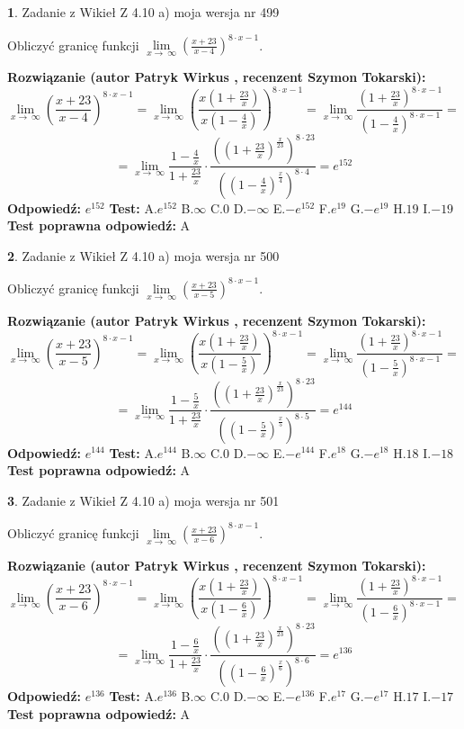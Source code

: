 \documentclass[12pt, a4paper]{article}
\theoremstyle{definition} %
\newtheorem{zad}{}
\newcommand{\zadStart}[1]{\begin{zad}#1\newline}
\newcommand{\zadStop}{\end{zad}}
\newcommand{\rozwStart}[2]{\noindent \textbf{Rozwiązanie (autor #1 , recenzent #2): }\newline}
\newcommand{\rozwStop}{\newline}
\newcommand{\odpStart}{\noindent \textbf{Odpowiedź:}\newline}
\newcommand{\odpStop}{\newline}
\newcommand{\testStart}{\noindent \textbf{Test:}\newline}
\newcommand{\testStop}{\newline}
\newcommand{\kluczStart}{\noindent \textbf{Test poprawna odpowiedź:}\newline}
\newcommand{\kluczStop}{\newline}
\begin{document}
\zadStart{Zadanie z Wikieł Z 4.10 a) moja wersja nr 499}

Obliczyć granicę funkcji  $\lim\limits_{x\to\ \infty}(\frac{x+23}{x-4})^{8\cdot x-1}$.
\zadStop
\rozwStart{Patryk Wirkus}{Szymon Tokarski}
$$\lim\limits_{x\to\ \infty}(\frac{x+23}{x-4})^{8\cdot x-1} = \lim\limits_{x\to\ \infty}(\frac{x(1+\frac{23}{x})}{x(1-\frac{4}{x})})^{8\cdot x-1}=\lim\limits_{x\to\ \infty}\frac{(1+\frac{23}{x})^{8\cdot x-1}}{(1-\frac{4}{x})^{8\cdot x-1}}=$$
$$=\lim\limits_{x\to\ \infty}\frac{1-\frac{4}{x}}{1+\frac{23}{x}}\cdot\frac{((1+\frac{23}{x})^{\frac{x}{23}})^{8\cdot23}}{((1-\frac{4}{x})^{\frac{x}{4}})^{8\cdot4}}=e^{152}$$
\rozwStop
\odpStart
$e^{152}$
\odpStop
\testStart
A.$e^{152}$ B.$\infty$ C.$0$ D.$-\infty$ E.$-e^{152}$
F.$e^{19}$ G.$-e^{19}$
H.$19$
I.$-19$
\testStop
\kluczStart
A
\kluczStop



\zadStart{Zadanie z Wikieł Z 4.10 a) moja wersja nr 500}

Obliczyć granicę funkcji  $\lim\limits_{x\to\ \infty}(\frac{x+23}{x-5})^{8\cdot x-1}$.
\zadStop
\rozwStart{Patryk Wirkus}{Szymon Tokarski}
$$\lim\limits_{x\to\ \infty}(\frac{x+23}{x-5})^{8\cdot x-1} = \lim\limits_{x\to\ \infty}(\frac{x(1+\frac{23}{x})}{x(1-\frac{5}{x})})^{8\cdot x-1}=\lim\limits_{x\to\ \infty}\frac{(1+\frac{23}{x})^{8\cdot x-1}}{(1-\frac{5}{x})^{8\cdot x-1}}=$$
$$=\lim\limits_{x\to\ \infty}\frac{1-\frac{5}{x}}{1+\frac{23}{x}}\cdot\frac{((1+\frac{23}{x})^{\frac{x}{23}})^{8\cdot23}}{((1-\frac{5}{x})^{\frac{x}{5}})^{8\cdot5}}=e^{144}$$
\rozwStop
\odpStart
$e^{144}$
\odpStop
\testStart
A.$e^{144}$ B.$\infty$ C.$0$ D.$-\infty$ E.$-e^{144}$
F.$e^{18}$ G.$-e^{18}$
H.$18$
I.$-18$
\testStop
\kluczStart
A
\kluczStop



\zadStart{Zadanie z Wikieł Z 4.10 a) moja wersja nr 501}

Obliczyć granicę funkcji  $\lim\limits_{x\to\ \infty}(\frac{x+23}{x-6})^{8\cdot x-1}$.
\zadStop
\rozwStart{Patryk Wirkus}{Szymon Tokarski}
$$\lim\limits_{x\to\ \infty}(\frac{x+23}{x-6})^{8\cdot x-1} = \lim\limits_{x\to\ \infty}(\frac{x(1+\frac{23}{x})}{x(1-\frac{6}{x})})^{8\cdot x-1}=\lim\limits_{x\to\ \infty}\frac{(1+\frac{23}{x})^{8\cdot x-1}}{(1-\frac{6}{x})^{8\cdot x-1}}=$$
$$=\lim\limits_{x\to\ \infty}\frac{1-\frac{6}{x}}{1+\frac{23}{x}}\cdot\frac{((1+\frac{23}{x})^{\frac{x}{23}})^{8\cdot23}}{((1-\frac{6}{x})^{\frac{x}{6}})^{8\cdot6}}=e^{136}$$
\rozwStop
\odpStart
$e^{136}$
\odpStop
\testStart
A.$e^{136}$ B.$\infty$ C.$0$ D.$-\infty$ E.$-e^{136}$
F.$e^{17}$ G.$-e^{17}$
H.$17$
I.$-17$
\testStop
\kluczStart
A
\kluczStop
\end{document}
